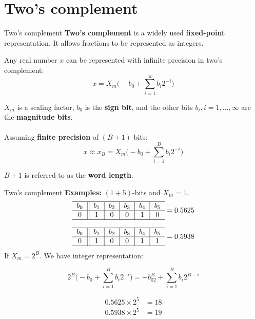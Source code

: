 \documentclass[10pt]{beamer}
\begin{document}
%
\section{Two's complement}
\begin{frame}{Two's complement}
\textbf{Two's complement} is a widely used \textbf{fixed-point} representation. It allows fractions to be represented as integers.

Any real number $x$ can be represented with infinite precision in two's complement:
\begin{equation*}
x = X_m\bigg(-b_0 + \sum_{i=1}^{\infty}b_i2^{-i}\bigg) \tag{infinite precision}
\end{equation*}

$X_m$ is a scaling factor, $b_0$ is the \textbf{sign bit}, and the other bits $b_i, i = 1, \ldots, \infty$ are the \textbf{magnitude bits}.
~\\
~\\

\pause
Assuming \textbf{finite precision} of $(B+1)$ bits: 
\begin{equation}
x \approx x_B=  X_m\bigg(-b_0 + \sum_{i=1}^{B}b_i2^{-i}\bigg) \tag{$B+1$ bits precision}
\end{equation}

$B+1$ is referred to as the \textbf{word length}.
\end{frame}

%
\begin{frame}{Two's complement}
\textbf{Examples:} $(1+5)$-bits and $X_m = 1$. 
\begin{equation*}
\begin{tabular}{c||c|c|c|c|c}
\hline
$b_0$ & $b_1$ & $b_2$ & $b_3$ & $b_4$ & $b_5$ \\
\hline
$0$ & $1$ & $0$ & $0$ & $1$ & $0$ \\
\hline
\end{tabular} = 0.5625
\end{equation*}

\begin{equation*}
	\begin{tabular}{c||c|c|c|c|c}
	\hline
	$b_0$ & $b_1$ & $b_2$ & $b_3$ & $b_4$ & $b_5$ \\
	\hline
	$0$ & $1$ & $0$ & $0$ & $1$ & $1$ \\
	\hline
	\end{tabular} = 0.5938
\end{equation*}
If $X_m = 2^B$. We have integer representation:  

\begin{equation*}
	2^B\bigg(-b_0 + \sum_{i=1}^{B}b_i2^{-i}\bigg) = -b_02^B + \sum_{i=1}^{B}b_i2^{B-i}
\end{equation*}

\begin{align*}
	0.5625\times 2^5 &= 18 \\
	0.5938\times 2^5 &= 19
\end{align*}
\end{frame}
\end{document}
